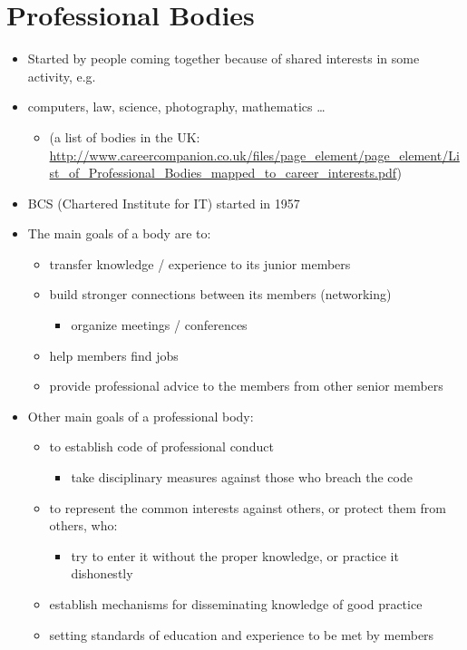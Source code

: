 \documentclass{article}
\begin{document}
\section{Professional Bodies}
\begin{itemize}
\item Started by people coming together because of shared interests in some activity, e.g.
\item computers, law, science, photography, mathematics \ldots
\begin{itemize}
\item (a list of bodies in the UK: \url{http://www.careercompanion.co.uk/files/page_element/page_element/List_of_Professional_Bodies_mapped_to_career_interests.pdf})
\end{itemize}
\item BCS (Chartered Institute for IT) started in 1957
\item The main goals of a body are to:
\begin{itemize}
\item transfer knowledge / experience to its junior members 
\item build stronger connections between its members (networking)
\begin{itemize}
\item organize meetings / conferences
\end{itemize}
\item help members find jobs
\item provide professional advice to the members from other senior members
\end{itemize}
\item Other main goals of a professional body:
\begin{itemize}
\item to establish code of professional conduct
\begin{itemize}
\item take disciplinary measures against those who breach the code
\end{itemize}
\item to represent the common interests against others, or protect them from others, who:
\begin{itemize}
\item try to enter it without the proper knowledge, or practice it dishonestly
\end{itemize}
\item establish mechanisms for disseminating knowledge of good practice
\item setting standards of education and experience to be met by members


\end{itemize}
\end{itemize}
\end{document}
